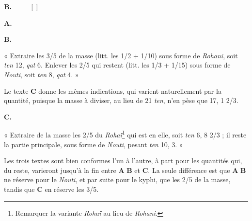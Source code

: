 \documentclass[a4paper, 11pt, oneside, landscape]{article}
\newcommand*\hieroAAAB{}
\newcommand*\hieroAAAM{}
\newcommand*\hieroAABT{}
\newcommand*\hieroAACQ{}
\newcommand*\hieroAACY{}
\newcommand*\hieroAADL{}
\newcommand*\hieroAADT{}
\newcommand*\hieroAAFD{}
\newcommand*\hieroAAFT{}
\newcommand*\hieroAAGA{}
\newcommand*\hieroAAGN{}
\newcommand*\hieroAAGP{}
\newcommand*\hieroAAHJ{}
\newcommand*\hieroAAHK{}
\newcommand*\hieroAAHW{}
\newcommand*\hieroAAIG{}
\newcommand*\hieroAAIJ{}
\newcommand*\hieroAAIO{}
\newcommand*\hieroAAIP{}
\newcommand*\hieroAAIT{}
\newcommand*\hieroAAIU{}
\newcommand*\hieroAAIW{}
\newcommand*\hieroAAIX{}
\newcommand*\hieroAAIY{}
\newcommand*\hieroAAIZ{}
\newcommand*\hieroAAJA{}
\newcommand*\hieroAAJB{}
\newcommand*\hieroAAJC{}
\newcommand*\hieroAAJD{}
\newcommand*\hieroAAJE{}
\newcommand*\hieroAAJF{}
\newcommand*\hieroAAJG{}
\newcommand*\hieroAAJH{}
\newcommand*\hieroAAJI{}
\newcommand*\hieroAAJJ{}
\newcommand*\hieroAAJK{}
\newcommand*\hieroAAJL{}
\newcommand*\hieroAAJM{\raisebox{1ex}{}}
\newcommand*\hieroAAJN{}
\newcommand*\hieroAAJO{}
\newcommand*\hieroAAJP{}
\newcommand*\hieroAAJQ{}
\newcommand*\hieroAAJR{}
\newcommand*\hieroAAJS{}
\newcommand*\hieroAAJT{}
\newcommand*\hieroAAJU{}
\newcommand*\hieroAAJV{}
\newcommand*\hieroAAJW{}
\newcommand*\hieroAAJX{}
\begin{document}
\hspace*{10mm}\textbf{B.}\hspace*{5mm} $\hieroAACQ\:\hieroAAIW\:\hieroAAIX\:\hieroAADT\:\hieroAADL\:\hieroAAIP\:\hieroAAIY\:\hieroAAIZ\:\hieroAAAM\:\hieroAAAM\:\hieroAADL$ [$\hieroAABT\:\hieroAAGN\:\hieroAAFT$] $\hieroAAIU\:\hieroAAJA\:\hieroAAJB\:\hieroAAJC$

\hspace*{10mm}\textbf{A.}\hspace*{5mm} $\hieroAAIJ\:\hieroAAJD\:\hieroAAHK\:\hieroAAJE\:\hieroAAGP\:\hieroAAJF\:\hieroAAIT\:\hieroAAJG\:\hieroAAGA\:\hieroAAJH$

\hspace*{10mm}\textbf{B.}\hspace*{5mm} $\hieroAAJI\:\hieroAAJJ\:\hieroAAJK\:\hieroAAGP\:\hieroAAAM\:\hieroAAAM\:\hieroAADL\:\hieroAABT\:\hieroAAGN\:\hieroAAFT\:\hieroAAJL\:\hieroAAGA\:\hieroAAJB\:\hieroAAJH$

« Extraire les 3/5 de la masse (litt. les 1/2 + 1/10) sous forme de \emph{Rohani}, soit \emph{ten} 12, \emph{qat} 6. Enlever les 2/5 qui restent (litt. les 1/3 + 1/15) sous forme de \emph{Nouti}, soit \emph{ten} 8, \emph{qat} 4. »

Le texte \textbf{C} donne les mêmes indications, qui varient naturellement par la quantité, puisque la masse à diviser, au lieu de 21 \emph{ten}, n'en pèse que 17, 1 2/3.

\hspace*{10mm}\textbf{C.}\hspace*{5mm} $\hieroAAJM\:\hieroAAIO\:\hieroAAJN\:\hieroAAJO\:\hieroAAJP\:\hieroAAJQ\:\hieroAAAB\:\hieroAAAM\:\hieroAAAM\:\hieroAAHW\:\hieroAAJR\:\hieroAAJS\:\hieroAAJT\:\hieroAAGA\:\hieroAAJU\:\hieroAAJV\:\hieroAAIG\:\hieroAAJW\:\hieroAAGP\:\hieroAACY\:\hieroAAAM\:\hieroAAAM\:\hieroAAHW\:\hieroAAFD\:\hieroAAJX\:\hieroAAGA\:\hieroAAHJ$

« Extraire de la masse les 2/5 du \emph{Rohaï}\footnote{Remarquer la variante \emph{Rohaï} au lieu de \emph{Rohani}.} qui est en elle, soit \emph{ten} 6, 8 2/3 ; il reste la partie principale, sous forme de \emph{Nouti}, pesant \emph{ten} 10, 3. »

Les trois textes sont bien conformes l'un à l'autre, à part pour les quantités qui, du reste, varieront jusqu'à la fin entre \textbf{A} \textbf{B} et \textbf{C}. La seule différence est que \textbf{A} \textbf{B} ne réserve pour le \emph{Nouti}, et par suite pour le kyphi, que les 2/5 de la masse, tandis que \textbf{C} en réserve les 3/5.
\end{document}
